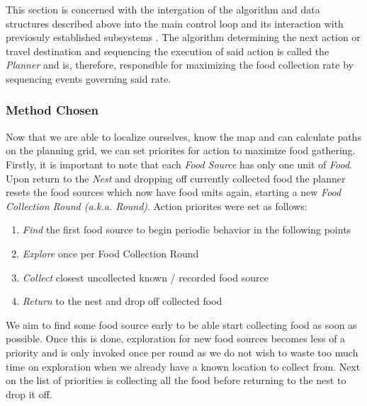 \documentclass[11pt, a4paper]{article}
\begin{document}
This section is concerned with the intergation of the algorithm and data structures described above 
into the main control loop and its interaction with previosuly established subsystems 
\cite{task2_report}. The algorithm determining the next action or travel destination and sequencing 
the execution of said action is called the \textit{Planner} and is, therefore, responsible for 
maximizing the food collection rate by sequencing events governing said rate.

\subsubsection{Method Chosen}
\label{Planner_Principle}

Now that we are able to localize ourselves, know the map and can calculate paths on the planning 
grid, we can set priorites for action to maximize food gathering. Firstly, it is important to 
note that each \textit{Food Source} has only one unit of \textit{Food}. 
Upon return to the \textit{Nest} and dropping off currently collected food the planner resets the 
food sources which now have food units again, starting a new \textit{Food Collection 
Round (a.k.a. Round)}. Action priorites were set as follows:

\begin{enumerate}
	\item \textit{Find} the first food source to begin periodic behavior in the following points
	\item \textit{Explore} once per Food Collection Round
	\item \textit{Collect} closest uncollected known / recorded food source
	\item \textit{Return} to the nest and drop off collected food
\end{enumerate}

We aim to find some food source early to be able start collecting food as soon as possible. 
Once this is done, exploration for new food sources becomes less of a priority and is only invoked 
once per round as we do not wish to waste too much time on exploration when we already have
a known location to collect from. Next on the list of priorities is collecting all the food before 
returning to the nest to drop it off.
\end{document}
